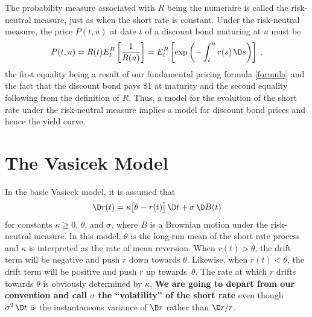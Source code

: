 The probability measure associated with $R$ being the numeraire is called the risk-neutral measure, just as when the short rate is constant.  Under the risk-neutral measure, the price $P(t,u)$ at date $t$ of a discount bond maturing at $u$ must be
\begin{equation}\label{basicbondprice}
P(t,u) = R(t) E^R_t \left[\frac{1}{R(u)}\right] = E^R_t \left[ \exp\left(-\int_t^u r(s)\,\D s\right)\right]\;,
\end{equation}
the first equality being a result of our fundamental pricing formula \eqref{formula} and the fact that the discount bond pays \$1 at maturity and the second equality following from the definition of $R$.  Thus, a model for the evolution of the short rate under the risk-neutral measure implies a model for discount bond prices and hence the yield curve.

\section{The Vasicek Model}\label{s_vasicek}

In the basic Vasicek \cite{Vasicek} model, it is assumed that
\begin{equation}\label{vasicek}
\D r(t) = \kappa\big[\theta-r(t)\big]\,\D t+\sigma\,\D B(t)
\end{equation}
for constants $\kappa\geq 0$, $\theta$, and $\sigma$, where $B$ is a Brownian motion under the risk-neutral measure.  In this model, $\theta$ is the long-run mean of the short rate process and $\kappa$ is interpreted as the rate of mean reversion.  When $r(t) >\theta$, the drift term will be negative and push $r$ down towards $\theta$.  Likewise, when $r(t) <\theta$, the drift term will be positive and push $r$ up towards~$\theta$.  The rate at which $r$ drifts towards $\theta$ is obviously determined by $\kappa$.  \textbf{We are going to depart from our convention and call $\sigma$ the ``volatility'' of the short rate} even though $\sigma^2\,\D t$ is the instantaneous variance of $\D r$ rather than $\D r/r$.

